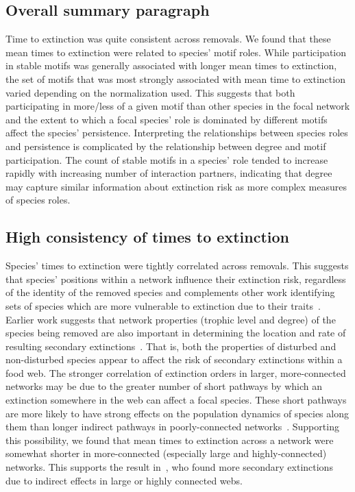 \documentclass[12pt]{article}
\begin{document}
	\subsection*{Overall summary paragraph}

		Time to extinction was quite consistent across removals. 
		We found that these mean times to extinction were related to species' motif roles.
		While participation in stable motifs was generally associated with longer mean times to extinction, the set of motifs that was most strongly associated with mean time to extinction varied depending on the normalization used.
		This suggests that both participating in more/less of a given motif than other species in the focal network and the extent to which a focal species' role is dominated by different motifs affect the species' persistence.
		Interpreting the relationships between species roles and persistence is complicated by the relationship between degree and motif participation.
		The count of stable motifs in a species' role tended to increase rapidly with increasing number of interaction partners, indicating that degree may capture similar information about extinction risk as more complex measures of species roles.



 	\subsection*{High consistency of times to extinction}

		Species' times to extinction were tightly correlated across removals. 
		This suggests that species' positions within a network influence their extinction risk, regardless of the identity of the removed species and complements other work identifying sets of species which are more vulnerable to extinction due to their traits~\citep{Curtsdotter2011,Ryser2019}. 
		Earlier work suggests that network properties (trophic level and degree) of the species being removed are also important in determining the location and rate of resulting secondary extinctions~\citep{Wootton2016a,Dunne2002}.
		That is, both the properties of disturbed and non-disturbed species appear to affect the risk of secondary extinctions within a food web.
		The stronger correlation of extinction orders in larger, more-connected networks may be due to the greater number of short pathways by which an extinction somewhere in the web can affect a focal species. 
		These short pathways are more likely to have strong effects on the population dynamics of species along them than longer indirect pathways in poorly-connected networks~\citep{Jordan2002,Jordan2006}.
		Supporting this possibility, we found that mean times to extinction across a network were somewhat shorter in more-connected (especially large and highly-connected) networks.
		This supports the result in~\citet{Wootton2016a}, who found more secondary extinctions due to indirect effects in large or highly connected webs. 
\end{document}
